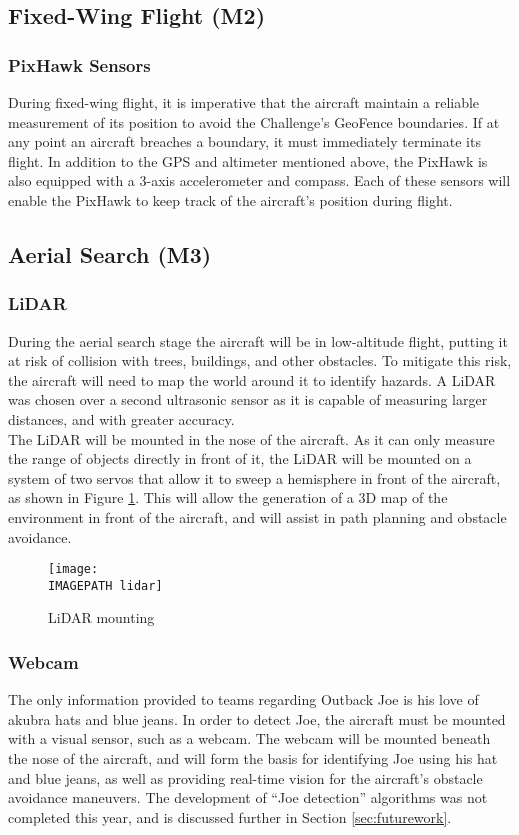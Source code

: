 \subsection{Fixed-Wing Flight (M2)}
\subsubsection*{PixHawk Sensors}
During fixed-wing flight, it is imperative that the aircraft maintain a reliable measurement of its position to avoid the Challenge's GeoFence boundaries. If at any point an aircraft breaches a boundary, it must immediately terminate its flight. In addition to the GPS and altimeter mentioned above, the PixHawk is also equipped with a 3-axis accelerometer and compass. Each of these sensors will enable the PixHawk to keep track of the aircraft's position during flight.

\subsection{Aerial Search (M3)}
\subsubsection*{LiDAR}
During the aerial search stage the aircraft will be in low-altitude flight, putting it at risk of collision with trees, buildings, and other obstacles. To mitigate this risk, the aircraft will need to map the world around it to identify hazards. A LiDAR was chosen over a second ultrasonic sensor as it is capable of measuring larger distances, and with greater accuracy.\\

The LiDAR will be mounted in the nose of the aircraft. As it can only measure the range of objects directly in front of it, the LiDAR will be mounted on a system of two servos that allow it to sweep a hemisphere in front of the aircraft, as shown in Figure \ref{fig:lidar}. This will allow the generation of a 3D map of the environment in front of the aircraft, and will assist in path planning and obstacle avoidance.

\begin{figure}[!ht]
	\centering
	\texttt{[image: \\IMAGEPATH lidar]}
	\caption{LiDAR mounting}
	\label{fig:lidar}
\end{figure}

\subsubsection*{Webcam}
The only information provided to teams regarding Outback Joe is his love of akubra hats and blue jeans. In order to detect Joe, the aircraft must be mounted with a visual sensor, such as a webcam. The webcam will be mounted beneath the nose of the aircraft, and will form the basis for identifying Joe using his hat and blue jeans, as well as providing real-time vision for the aircraft's obstacle avoidance maneuvers. The development of ``Joe detection'' algorithms was not completed this year, and is discussed further in Section \ref{sec:futurework}.

